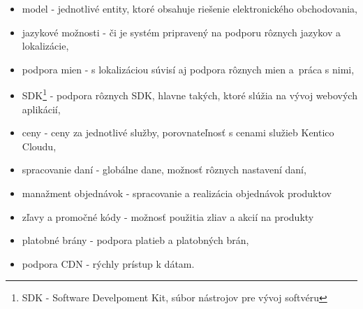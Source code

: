 \documentclass[
  printed, %
  table,   %
  lof,     %
  nolot,     %
  twoside,  
]{fithesis3}
\begin{document}
\begin{itemize}
	\item model - jednotlivé entity, ktoré obsahuje riešenie elektronického obchodovania,
	\item jazykové možnosti - či je systém pripravený na podporu rôznych jazykov a lokalizácie,
	\item podpora mien - s lokalizáciou súvisí aj podpora rôznych mien a~práca s nimi,
	\item SDK\footnote{SDK - Software Develpoment Kit, súbor nástrojov pre vývoj softvéru} - podpora rôznych SDK, hlavne takých, ktoré slúžia na vývoj webových aplikácií,
	\item ceny - ceny za jednotlivé služby, porovnateľnosť s cenami služieb Kentico Cloudu,
	\item spracovanie daní - globálne dane, možnosť rôznych nastavení daní,
	\item manažment objednávok - spracovanie a realizácia objednávok produktov
	\item zľavy a promočné kódy - možnosť použitia zliav a akcií na produkty
	\item platobné brány - podpora platieb a platobných brán,
	\item podpora CDN - rýchly prístup k dátam.
\end{itemize}
\end{document}
